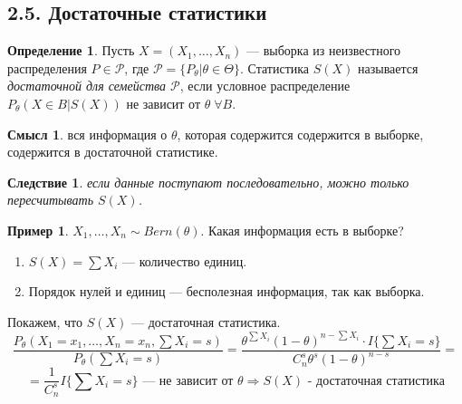 \documentclass[12pt]{report}
\newtheorem{corollary}{Следствие}
\theoremstyle{definition}
\newtheorem{definition}{Определение}
\newtheorem{example}{Пример}
\newtheorem{sense}{Смысл}
\begin{document}
\subsection{2.5. Достаточные статистики}
\begin{definition}
	Пусть $X = (X_1, \ldots, X_n)$ — выборка из неизвестного распределения $P \in \mathcal{P}$, где $\mathcal{P} = \{P_\theta | \theta \in \Theta\}$.
	Статистика $S(X)$ называется \emph{достаточной для семейства $\mathcal{P}$}, если условное распределение $P_\theta(X \in B | S(X))$ не зависит от $\theta \; \forall B$.
\end{definition}
\begin{sense}
	вся информация о $\theta$, которая содержится содержится в выборке, содержится в достаточной статистике.
\end{sense}
\begin{corollary}
	если данные поступают последовательно, можно только пересчитывать $S(X)$.
\end{corollary}
\begin{example}
	$X_1, \ldots, X_n \sim Bern(\theta)$. Какая информация есть в выборке?
	\begin{enumerate}
		\item $S(X) = \sum X_i$ — количество единиц.
		\item Порядок нулей и единиц — бесполезная информация, так как выборка.
	\end{enumerate}
	Покажем, что $S(X)$ — достаточная статистика. $$\dfrac{P_\theta(X_1 = x_1,\ldots, X_n = x_n, \sum X_i = s)}{P_\theta(\sum X_i = s)} = \dfrac{\theta^{\sum X_i}(1-\theta)^{n - \sum X_i} \cdot I\{\sum X_i = s\}}{C_n^s \theta^s (1-\theta)^{n-s}}=$$ 
	$$= \dfrac{1}{C_n^s} I\{\sum X_i = s\} \text{ — не зависит от } \theta \Rightarrow S(X) \text{ - достаточная статистика}$$
\end{example}
\end{document}
